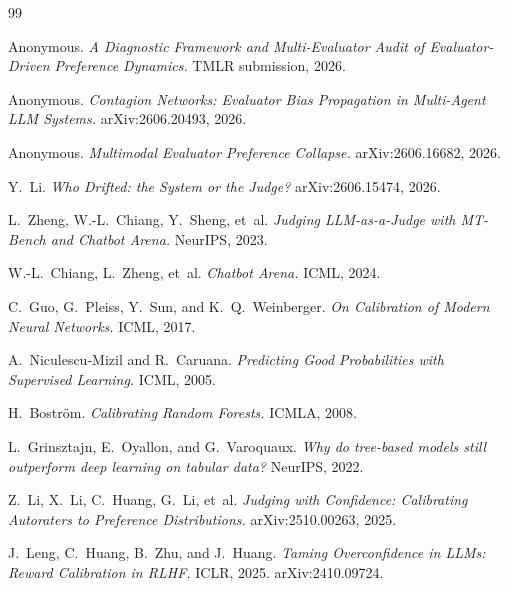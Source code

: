 \documentclass[11pt]{article}
\begin{document}





\begin{thebibliography}{99}

 Anonymous.
\newblock \textit{A Diagnostic Framework and Multi-Evaluator Audit of Evaluator-Driven Preference Dynamics.} TMLR submission, 2026.

 Anonymous.
\newblock \textit{Contagion Networks: Evaluator Bias Propagation in Multi-Agent LLM Systems.} arXiv:2606.20493, 2026.

 Anonymous.
\newblock \textit{Multimodal Evaluator Preference Collapse.} arXiv:2606.16682, 2026.

 Y.~Li.
\newblock \textit{Who Drifted: the System or the Judge?} arXiv:2606.15474, 2026.

 L.~Zheng, W.-L.~Chiang, Y.~Sheng, et~al.
\newblock \textit{Judging LLM-as-a-Judge with MT-Bench and Chatbot Arena.} NeurIPS, 2023.

 W.-L.~Chiang, L.~Zheng, et~al.
\newblock \textit{Chatbot Arena.} ICML, 2024.

 C.~Guo, G.~Pleiss, Y.~Sun, and K.~Q.~Weinberger.
\newblock \textit{On Calibration of Modern Neural Networks.} ICML, 2017.

 A.~Niculescu-Mizil and R.~Caruana.
\newblock \textit{Predicting Good Probabilities with Supervised Learning.} ICML, 2005.

 H.~Bostr{\"o}m.
\newblock \textit{Calibrating Random Forests.} ICMLA, 2008.

 L.~Grinsztajn, E.~Oyallon, and G.~Varoquaux.
\newblock \textit{Why do tree-based models still outperform deep learning on tabular data?} NeurIPS, 2022.

 Z.~Li, X.~Li, C.~Huang, G.~Li, et~al.
\newblock \textit{Judging with Confidence: Calibrating Autoraters to Preference Distributions.} arXiv:2510.00263, 2025.

 J.~Leng, C.~Huang, B.~Zhu, and J.~Huang.
\newblock \textit{Taming Overconfidence in LLMs: Reward Calibration in RLHF.} ICLR, 2025. arXiv:2410.09724.


\end{thebibliography}
\end{document}
